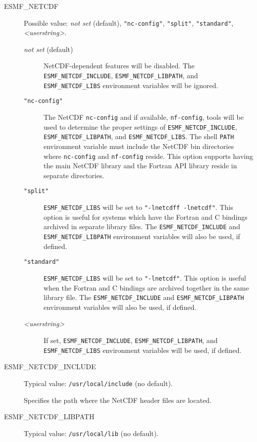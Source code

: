 \begin{description}

\item[ESMF\_NETCDF] Possible value: {\it not set} (default), {\tt "nc-config"}, {\tt "split"}, 
{\tt "standard"}, {\it <userstring>}.

\begin{description}
\item[{\it not set} (default)] NetCDF-dependent features will be disabled.
The {\tt ESMF\_NETCDF\_INCLUDE}, {\tt ESMF\_NETCDF\_LIBPATH}, and
{\tt ESMF\_NETCDF\_LIBS} environment variables will be ignored.

\item[{\tt "nc-config"}] The NetCDF {\tt nc-config} and if available, {\tt nf-config},
tools will be used to determine the proper settings of {\tt ESMF\_NETCDF\_INCLUDE},
{\tt ESMF\_NETCDF\_LIBPATH}, and {\tt ESMF\_NETCDF\_LIBS}.  The shell {\tt PATH}
environment variable must include the NetCDF bin directories where {\tt nc-config}
and {\tt nf-config} reside.  This option supports having the main NetCDF library and the
Fortran API library reside in separate directories.

\item[{\tt "split"}] {\tt ESMF\_NETCDF\_LIBS} will be set to 
{\tt "-lnetcdff -lnetcdf"}.  This option is useful for systems 
which have the Fortran and C bindings archived in separate library files.  
The {\tt ESMF\_NETCDF\_INCLUDE} and {\tt ESMF\_NETCDF\_LIBPATH}
environment variables will also be used, if defined.

\item[{\tt "standard"}] {\tt ESMF\_NETCDF\_LIBS} will be set to 
{\tt "-lnetcdf"}.  This option is useful when the Fortran and 
C bindings are archived together in the same library file.  The {\tt ESMF\_NETCDF\_INCLUDE} 
and {\tt ESMF\_NETCDF\_LIBPATH} environment variables will also be used, 
if defined.

\item[{\it <userstring>}] If set, {\tt ESMF\_NETCDF\_INCLUDE}, 
{\tt ESMF\_NETCDF\_LIBPATH}, and {\tt ESMF\_NETCDF\_LIBS} environment 
variables will be used, if defined.
\end{description}

\item[ESMF\_NETCDF\_INCLUDE] Typical value: {\tt /usr/local/include} 
(no default).

Specifies the path where the NetCDF header files are located.

\item[ESMF\_NETCDF\_LIBPATH] Typical value: {\tt /usr/local/lib} (no default).


\end{description}
